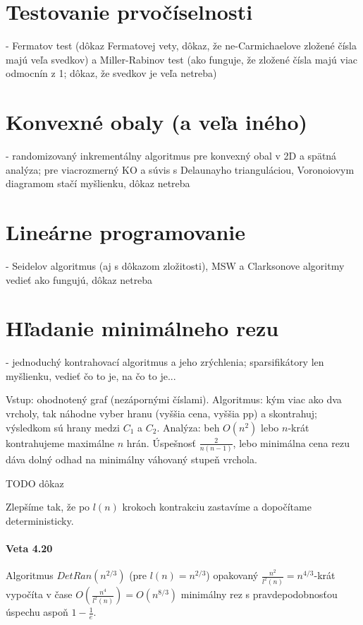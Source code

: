 \documentclass[12pt,a4paper]{article}
\begin{document}
\section{Testovanie prvočíselnosti}
 - Fermatov test (dôkaz Fermatovej vety, dôkaz, že ne-Carmichaelove zložené čísla majú veľa svedkov) a Miller-Rabinov test (ako funguje, že zložené čísla majú viac odmocnín z 1; dôkaz, že svedkov je veľa netreba)
 

\section{Konvexné obaly (a veľa iného)}
 - randomizovaný inkrementálny algoritmus pre konvexný obal v 2D a spätná analýza; pre viacrozmerný KO a súvis s Delaunayho trianguláciou, Voronoiovym diagramom stačí myšlienku, dôkaz netreba
 

\section{Lineárne programovanie}
 - Seidelov algoritmus (aj s dôkazom zložitosti), MSW a Clarksonove algoritmy vedieť ako fungujú, dôkaz netreba
 

\section{Hľadanie minimálneho rezu}
\label{sec:min-cut} 
 - jednoduchý kontrahovací algoritmus a jeho zrýchlenia; sparsifikátory len myšlienku, vedieť čo to je, na čo to je...
 
Vstup: ohodnotený graf (nezápornými číslami). Algoritmus: kým viac ako dva vrcholy, tak náhodne vyber hranu (vyššia cena, vyššia pp) a skontrahuj; výsledkom sú hrany medzi $C_1$ a $C_2$. Analýza: beh $O(n^2)$ lebo $n$-krát kontrahujeme maximálne $n$ hrán. Úspešnosť $\frac{2}{n(n-1)}$, lebo minimálna cena rezu dáva dolný odhad na minimálny váhovaný stupeň vrchola. 

TODO dôkaz 

Zlepšíme tak, že po $l(n)$ krokoch kontrakciu zastavíme a dopočítame deterministicky. 
\paragraph{Veta 4.20} Algoritmus $DetRan(n^{2/3})$ (pre $l(n) = n^{2/3}$) opakovaný $\frac{n^2}{l^2(n)} = n^{4/3}$-krát vypočíta v čase $O(\frac{n^4}{l^2(n)}) = O(n^{8/3})$ minimálny rez s pravdepodobnosťou úspechu aspoň $1 - \frac{1}{e}$. 
\end{document}
